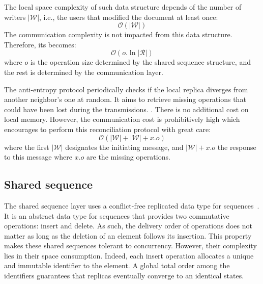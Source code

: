 \begin{asparadesc}
  The local space complexity of such data structure depends of the number of
  writers $|\mathcal{W}|$, i.e., the users that modified the document at least
  once:
  \begin{equation}
    \mathcal{O}(|\mathcal{W}|)
  \end{equation}
  The communication complexity is not impacted from this data
  structure. Therefore, its becomes:
  \begin{equation}
    \mathcal{O}(o.\ln |\mathcal{R}|)
  \end{equation}
  where $o$ is the operation size determined by the shared sequence structure,
  and the rest is determined by the communication layer.
  
\item [The anti-entropy protocol] periodically checks if the local replica
  diverges from another neighbor's one at random. It aims to retrieve missing
  operations that could have been lost during the
  transmissions. . There is no additional cost on local
  memory. However, the communication cost is prohibitively high which encourages
  to perform this reconciliation protocol with great care:
  \begin{equation}
    \mathcal{O}(|\mathcal{W}|+|\mathcal{W}|+x.o)
  \end{equation}
  where the first $|\mathcal{W}|$ designates the initiating message, and
  $|\mathcal{W}|+x.o$ the response to this message where $x.o$ are the missing
  operations.
\end{asparadesc}

\subsection{Shared sequence}
\label{subsec:sequence}

The shared sequence layer uses a conflict-free replicated data type for
sequences~\cite{shapiro2011comprehensive, shapiro2011conflict}. It is an
abstract data type for sequences that provides two commutative operations:
insert and delete. As such, the delivery order of operations does not matter as
long as the deletion of an element follows its insertion. This property makes
these shared sequences tolerant to concurrency. However, their complexity lies
in their space consumption. Indeed, each insert operation allocates a unique and
immutable identifier to the element. A global total order among the identifiers
guarantees that replicas eventually converge to an identical states.

